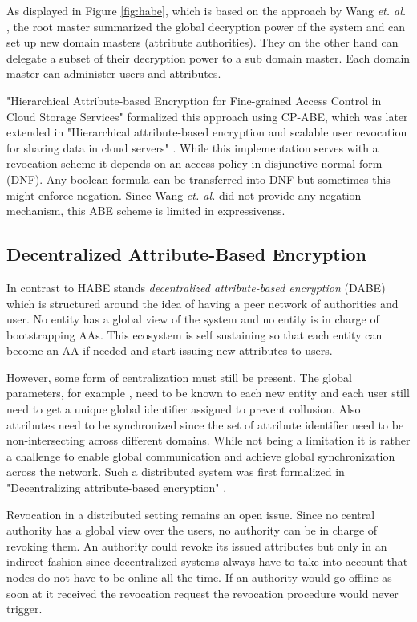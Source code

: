 As displayed in Figure \ref{fig:habe}, which is based on the approach by Wang \textit{et. al.} \cite{wang2011hierarchical}, the root master summarized the global decryption power of the system and can set up new domain masters (attribute authorities). They on the other hand can delegate a subset of their decryption power to a sub domain master. Each domain master can administer users and attributes.

"Hierarchical Attribute-based Encryption for Fine-grained Access Control in Cloud Storage Services" \cite{Wang:2010:HAE:1866307.1866414} formalized this approach using \ac{CP-ABE}, which was later extended in "Hierarchical attribute-based encryption and scalable user revocation for sharing data in cloud servers" \cite{wang2011hierarchical}. While this implementation serves with a revocation scheme it depends on an access policy in disjunctive normal form (\ac{DNF}). Any boolean formula can be transferred into DNF but sometimes this might enforce negation. Since Wang \textit{et. al.} \cite{wang2011hierarchical} did not provide any negation mechanism, this ABE scheme is limited in expressivenss.

\subsection{Decentralized Attribute-Based Encryption}
\label{sec:DABE}
In contrast to HABE stands \textit{decentralized attribute-based encryption} (\ac{DABE}) which is structured around the idea of having a peer network of authorities and user. No entity has a global view of the system and no entity is in charge of bootstrapping AAs. This ecosystem is self sustaining so that each entity can become an \ac{AA} if needed and start issuing new attributes to users. 

However, some form of centralization must still be present. The global parameters, for example , need to be known to each new entity and each user still need to get a unique global identifier assigned to prevent collusion. Also attributes need to be synchronized since the set of attribute identifier need to be non-intersecting across different domains. While not being a limitation it is rather a challenge to enable global communication and achieve global synchronization across the network. Such a distributed system was first formalized in "Decentralizing attribute-based encryption" \cite{lewko2011decentralizing}. 

Revocation in a distributed setting remains an open issue. Since no central authority has a global view over the users, no authority can be in charge of revoking them. An authority could revoke its issued attributes but only in an indirect fashion since decentralized systems always have to take into account that nodes do not have to be online all the time. If an authority would go offline as soon at it received the revocation request the revocation procedure would never trigger. 

